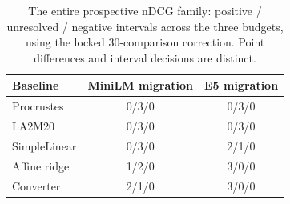 \begin{table}[t]
\centering
\small
\setlength{\tabcolsep}{4pt}
\caption{The entire prospective nDCG family: positive / unresolved / negative intervals across the three budgets, using the locked 30-comparison correction. Point differences and interval decisions are distinct.}\label{tab:trec-family}
\begin{tabular}{lcc}
\toprule
Baseline & MiniLM migration & E5 migration \\
\midrule
Procrustes & 0/3/0 & 0/3/0 \\
LA2M20 & 0/3/0 & 0/3/0 \\
SimpleLinear & 0/3/0 & 2/1/0 \\
Affine ridge & 1/2/0 & 3/0/0 \\
Converter & 2/1/0 & 3/0/0 \\
\bottomrule
\end{tabular}
\end{table}
